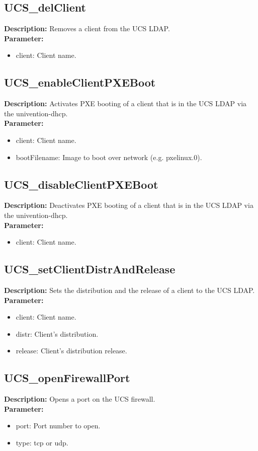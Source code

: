 \subsection{UCS\_delClient}
\textbf{Description:} Removes a client from the UCS LDAP.\\
\textbf{Parameter:}
\begin{itemize}
\item client: Client name.
\end{itemize}

\subsection{UCS\_enableClientPXEBoot}
\textbf{Description:} Activates PXE booting of a client that is in the UCS LDAP via the univention-dhcp.\\
\textbf{Parameter:}
\begin{itemize}
\item client: Client name.
\item bootFilename: Image to boot over network (e.g. pxelinux.0).
\end{itemize}

\subsection{UCS\_disableClientPXEBoot}
\textbf{Description:} Deactivates PXE booting of a client that is in the UCS LDAP via the univention-dhcp.\\
\textbf{Parameter:}
\begin{itemize}
\item client: Client name.
\end{itemize}

\subsection{UCS\_setClientDistrAndRelease}
\textbf{Description:} Sets the distribution and the release of a client to the UCS LDAP.\\
\textbf{Parameter:}
\begin{itemize}
\item client: Client name.
\item distr: Client's distribution.
\item release: Client's distribution release.
\end{itemize}

\subsection{UCS\_openFirewallPort}
\textbf{Description:} Opens a port on the UCS firewall.\\
\textbf{Parameter:}
\begin{itemize}
\item port: Port number to open.
\item type: tcp or udp.
\end{itemize}

